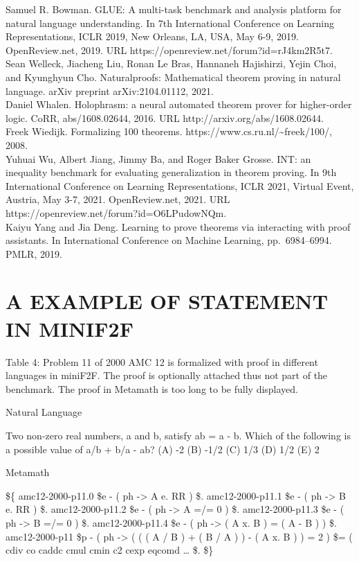 \documentclass[
]{article}
\begin{document}
Samuel R. Bowman. GLUE: A multi-task benchmark and analysis platform for
natural language understanding. In 7th International Conference on
Learning Representations, ICLR 2019, New Orleans, LA, USA, May 6-9,
2019. OpenReview.net, 2019. URL
https://openreview.net/forum?id=rJ4km2R5t7.\\
Sean Welleck, Jiacheng Liu, Ronan Le Bras, Hannaneh Hajishirzi, Yejin
Choi, and Kyunghyun Cho. Naturalproofs: Mathematical theorem proving in
natural language. arXiv preprint arXiv:2104.01112, 2021.\\
Daniel Whalen. Holophrasm: a neural automated theorem prover for
higher-order logic. CoRR, abs/1608.02644, 2016. URL
http://arxiv.org/abs/1608.02644.\\
Freek Wiedijk. Formalizing 100 theorems.
https://www.cs.ru.nl/\textasciitilde freek/100/, 2008.\\
Yuhuai Wu, Albert Jiang, Jimmy Ba, and Roger Baker Grosse. INT: an
inequality benchmark for evaluating generalization in theorem proving.
In 9th International Conference on Learning Representations, ICLR 2021,
Virtual Event, Austria, May 3-7, 2021. OpenReview.net, 2021. URL
https://openreview.net/forum?id=O6LPudowNQm.\\
Kaiyu Yang and Jia Deng. Learning to prove theorems via interacting with
proof assistants. In International Conference on Machine Learning,
pp.~6984--6994. PMLR, 2019.

\section{A EXAMPLE OF STATEMENT IN
MINIF2F}\label{a-example-of-statement-in-minif2f}

Table 4: Problem 11 of 2000 AMC 12 is formalized with proof in different
languages in miniF2F. The proof is optionally attached thus not part of
the benchmark. The proof in Metamath is too long to be fully displayed.

Natural Language

Two non-zero real numbers, a and b, satisfy ab = a - b. Which of the
following is a possible value of a/b + b/a - ab? (A) -2 (B) -1/2 (C) 1/3
(D) 1/2 (E) 2

Metamath

\$\{ amc12-2000-p11.0 \$e \textbar{} - ( ph -\textgreater{} A e. RR )
\$. amc12-2000-p11.1 \$e \textbar{} - ( ph -\textgreater{} B e. RR ) \$.
amc12-2000-p11.2 \$e \textbar{} - ( ph -\textgreater{} A =/= 0 ) \$.
amc12-2000-p11.3 \$e \textbar{} - ( ph -\textgreater{} B =/= 0 ) \$.
amc12-2000-p11.4 \$e \textbar{} - ( ph -\textgreater{} ( A x. B ) = ( A
- B ) ) \$. amc12-2000-p11 \$p \textbar{} - ( ph -\textgreater{} ( ( ( A
/ B ) + ( B / A ) ) - ( A x. B ) ) = 2 ) \$= ( cdiv co caddc cmul cmin
c2 cexp eqcomd \ldots{} \$. \$\}
\end{document}

